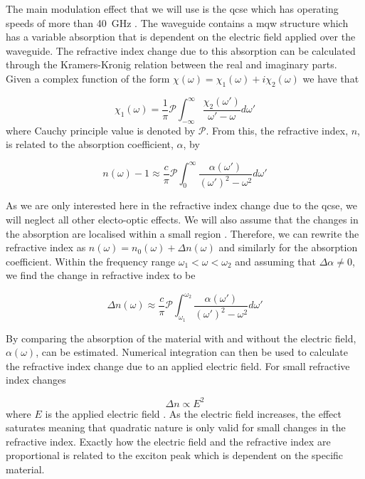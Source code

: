 The main modulation effect that we will use is the \ac{qcse} which has operating speeds of more than \SI{40}{GHz} \cite{qcse, smit2014}. The waveguide contains a \ac{mqw} structure which has a variable absorption that is dependent on the electric field applied over the waveguide. The refractive index change due to this absorption can be calculated through the Kramers-Kronig relation between the real and imaginary parts. Given a complex function of the form $\chi(\omega) = \chi_1(\omega) + i \chi_2(\omega)$ we have that

\begin{equation}
	\chi_1(\omega) = \frac{1}{\pi} \mathcal{P} \int_{-\infty}^{\infty} \frac{\chi_2(\omega')}{\omega' - \omega} d\omega'
\end{equation}
where Cauchy principle value is denoted by $\mathcal{P}$. From this, the refractive index, $n$, is related to the absorption coefficient, $\alpha$, by \cite{Hutchings1992}

\begin{equation}
	n(\omega) - 1 \approx \frac{c}{\pi}\mathcal{P}\int_0^\infty \frac{\alpha(\omega')}{(\omega')^2 - \omega^2} d\omega'
\end{equation}

As we are only interested here in the refractive index change due to the \ac{qcse}, we will neglect all other electo-optic effects. We will also assume that the changes in the absorption are localised within a small region \cite{weiner1987}. Therefore, we can rewrite the refractive index as $n(\omega) = n_0(\omega) + \Delta n (\omega)$ and similarly for the absorption coefficient. Within the frequency range $\omega_1 < \omega < \omega_2$ and assuming that $\Delta \alpha \ne 0$, we find the change in refractive index to be

\begin{equation}
	\Delta n(\omega) \approx \frac{c}{\pi}\mathcal{P}\int_{\omega_1}^{\omega_2} \frac{\alpha(\omega')}{(\omega')^2 - \omega^2} d\omega'
\end{equation}

By comparing the absorption of the material with and without the electric field, $\alpha(\omega)$, can be estimated. Numerical integration can then be used to calculate the refractive index change due to an applied electric field. For small refractive index changes

\begin{equation}
	\Delta n \propto E^2
\end{equation}
where $E$ is the applied electric field \cite{qcse}. As the electric field increases, the effect saturates meaning that quadratic nature is only valid for small changes in the refractive index. Exactly how the electric field and the refractive index are proportional is related to the exciton peak which is dependent on the specific material. 

